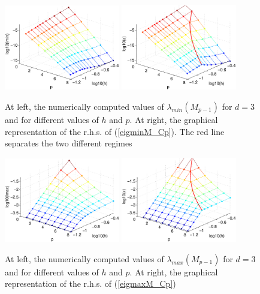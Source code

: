 \documentclass[11pt]{article}
\begin{document}
\begin{figure}
\begin{center}
\includegraphics[width=0.45\textwidth]{Images/igap_eigM3min.eps}\quad
\includegraphics[width=0.45\textwidth]{Images/igap_eigM3smin.eps}\\
\end{center}
\caption{At left, the numerically computed values of
$\lambda_{min}(M_{p-1})$ for $d=3$ and
for different values of $h$ and $p$. At right,
the graphical representation of the r.h.s. of (\ref{eigminM_Cp}). The red line
separates the two different regimes}
\label{fig:massmin-igapd3}
\end{figure}

\begin{figure}
\begin{center}
\includegraphics[width=0.45\textwidth]{Images/igap_eigM3max.eps}\quad
\includegraphics[width=0.45\textwidth]{Images/igap_eigM3smax.eps}\\
\end{center}
\caption{At left, the numerically computed values of
$\lambda_{max}(M_{p-1})$ for $d=3$ and
for different values of $h$ and $p$. At right,
the graphical representation of the r.h.s. of (\ref{eigmaxM_Cp})}
\label{fig:massmax-igapd3}
\end{figure}
\end{document}
